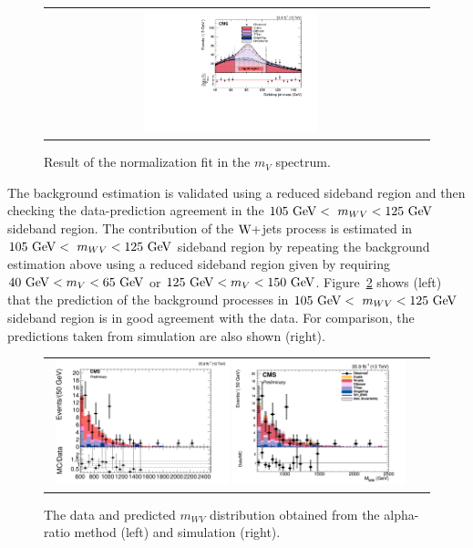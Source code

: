 \begin{figure}[!htbp] 
	 \centering 
	 \begin{tabular}{cc}
	 \includegraphics[width=0.48\textwidth]{Plots/BackgroundEstimation/WV/m_j_fitting/m_j_sideband_WJets0_xww__with_pull.pdf}
	 \end{tabular}
	 \caption{Result of the normalization fit in the $m_{V}$ spectrum.}
	 \label{fig:Wjet_SR_SBR_Comp}
\end{figure}

The background estimation is validated using a reduced sideband region and then checking the data-prediction agreement in the  $105~\mathrm{GeV}<~m_{WV}<125~\mathrm{GeV}$ sideband region. The contribution of the $\mathrm{W}+$jets process is estimated in $105~\mathrm{GeV}<~m_{WV}<125~\mathrm{GeV}$ sideband region by repeating the background estimation above using a reduced sideband region given by requiring $40~\mathrm{GeV} < m_{V} < 65~\mathrm{GeV}$ or $125~\mathrm{GeV} < m_{V} < 150~\mathrm{GeV}$. Figure~\ref{fig:closure} shows (left) that the prediction of the background processes in $105~\mathrm{GeV}<~m_{WV}<125~\mathrm{GeV}$ sideband region is in good agreement with the data. For comparison, the predictions taken from simulation are also shown (right). 

\begin{figure}[!htbp] 
	 \centering 
	 \begin{tabular}{cc}
	 \includegraphics[width=0.48\textwidth]{Plots/BackgroundEstimation/WV/signal_region_Closure_test_AfterCorrShape_38bins.png}
         \includegraphics[width=0.48\textwidth]{Plots/BackgroundEstimation/WV/DibosonBoostedElMuCuts13TeV_WjetControlRegion_Tighter_CHS_mass_lvj_type0_PuppiAK8_ClosureTest_SignalRegion.png}  
	 \end{tabular}
	 \caption{The data and predicted $m_{WV}$ distribution obtained from the alpha-ratio method (left) and simulation (right).}
	 \label{fig:closure}
\end{figure}


